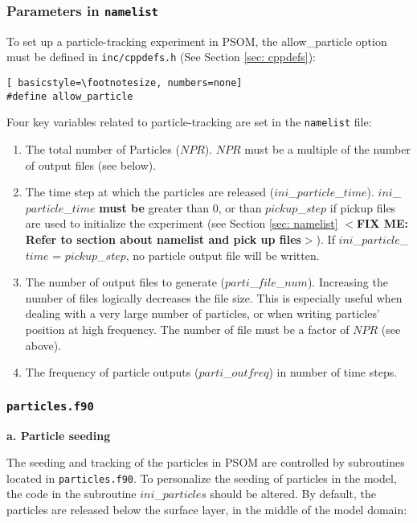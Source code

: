 \documentclass[12pt,letterpaper,titlepage]{article}
\newcommand{\fixme}[1]{\color{red}$<$\textbf{FIX ME: #1}$>$\color{black}}
\begin{document}
\subsubsection{Parameters in \texttt{namelist}}
To set up a particle-tracking experiment in PSOM, the allow\_particle option must be defined in \texttt{inc/cppdefs.h} (See Section \ref{sec: cppdefs}):
\begin{lstlisting}[	basicstyle=\footnotesize, numbers=none]
#define allow_particle
\end{lstlisting}
Four key variables related to particle-tracking are set in the \texttt{namelist} file:
\begin{enumerate}
	\item The total number of Particles ($NPR$). $NPR$ must be a multiple of the number of output files (see below).
	\item The time step at which the particles are released ($ini$\_$particle$\_$time$). $ini$\_$particle$\_$time$ \textbf{must be} greater than 0, or than $pickup$\_$step$ if pickup files are used to initialize the experiment (see Section \ref{sec: namelist} \fixme{Refer to section about namelist and pick up files}). If $ini$\_$particle$\_$time$ = $pickup$\_$step$, no particle output file will be written.
	\item The number of output files to generate ($parti$\_$file$\_$num$). Increasing the number of files logically decreases the file size. This is especially useful when dealing with a very large number of particles, or when writing particles' position at high frequency. The number of file must be a factor of $NPR$ (see above).
	\item The frequency of particle outputs ($parti$\_$outfreq$) in number of time steps.
\end{enumerate}

\subsubsection{\texttt{particles.f90}}
\label{sec: perso_particles}

\textbf{\indent a. Particle seeding\\}

The seeding and tracking of the particles in PSOM are controlled by subroutines located in \texttt{particles.f90}. To personalize the seeding of particles in the model, the code in the subroutine $ini$\_$particles$ should be altered. By default, the particles are released below the surface layer, in the middle of the model domain:
\end{document}
